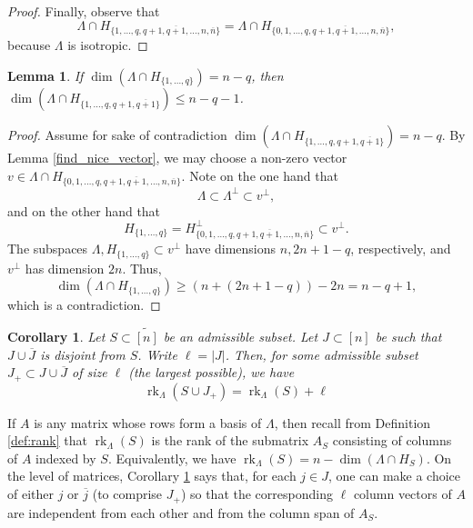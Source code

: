 \documentclass[12pt]{amsart}
\newtheorem{corollary}[definition]{Corollary}
\newtheorem{lemma}[definition]{Lemma}
\DeclareMathOperator{\rk}{rk}
\newcommand{\wtn}{\widetilde{[n]}}
\newcommand{\barj}{\overline{j}}
\begin{document}
\begin{proof}
Finally, observe that
\begin{equation*}
    \Lambda\cap H_{\{1,\ldots,q,q+1,\overline{q+1},\ldots,n,\overline{n}\}}=\Lambda\cap H_{\{0,1,\ldots,q,q+1,\overline{q+1},\ldots,n,\overline{n}\}},
\end{equation*}
because $\Lambda$ is isotropic.
\end{proof}

\begin{lemma}\label{rank+1}
If $\dim(\Lambda\cap H_{\{1,\ldots,q\}})=n-q$, then $\dim(\Lambda\cap H_{\{1,\ldots,q,q+1,\overline{q+1}\}})\le n-q-1$.
\end{lemma}

\begin{proof}
 Assume for sake of contradiction $\dim(\Lambda\cap H_{\{1,\ldots,q,q+1,\overline{q+1}\}})=n-q$. By Lemma \ref{find_nice_vector}, we may choose a non-zero vector $v\in \Lambda\cap H_{\{0,1,\ldots,q,q+1,\overline{q+1},\ldots,n,\overline{n}\}}$. Note on the one hand that 
 \begin{equation*}
     \Lambda\subset \Lambda^{\perp}\subset v^{\perp},
 \end{equation*}
 and on the other hand that 
 \begin{equation*}
      H_{\{1,\ldots,q\}} = H_{\{0,1,\ldots,q,q+1,\overline{q+1},\ldots,n,\overline{n}\}}^{\perp} \subset v^{\perp}.
 \end{equation*}
 The subspaces $\Lambda,H_{\{1,\ldots,q\}}\subset v^{\perp}$ have dimensions $n,2n+1-q$, respectively, and $v^{\perp}$ has dimension $2n$. Thus,
 \begin{equation*}
     \dim(\Lambda\cap H_{\{1,\ldots,q\}})\ge (n+(2n+1-q))-2n=n-q+1,
 \end{equation*}
 which is a contradiction.
\end{proof}

\begin{corollary}\label{cor:rank+j}
    Let $S\subset \wtn$ be an admissible subset. Let $J\subset[n]$ be such that $J\cup \overline {J}$ is disjoint from $S$. Write $\ell=|J|$. Then, for some admissible subset $J_+\subset J\cup \overline {J}$ of size $\ell$ (the largest possible), we have
    \begin{equation*}
        \rk_\Lambda(S\cup J_+) = \rk_\Lambda(S)+\ell
    \end{equation*}
\end{corollary}

If $A$ is any matrix whose rows form a basis of $\Lambda$, then recall from Definition \ref{def:rank} that $\rk_\Lambda(S)$ is the rank of the submatrix $A_S$ consisting of columns of $A$ indexed by $S$. Equivalently, we have $\rk_\Lambda(S)=n-\dim(\Lambda\cap H_S)$. On the level of matrices, Corollary \ref{cor:rank+j} says that, for each $j\in J$, one can make a choice of either $j$ or $\barj$ (to comprise $J_+$) so that the corresponding $\ell$ column vectors of $A$ are independent from each other and from the column span of $A_S$.
\end{document}
